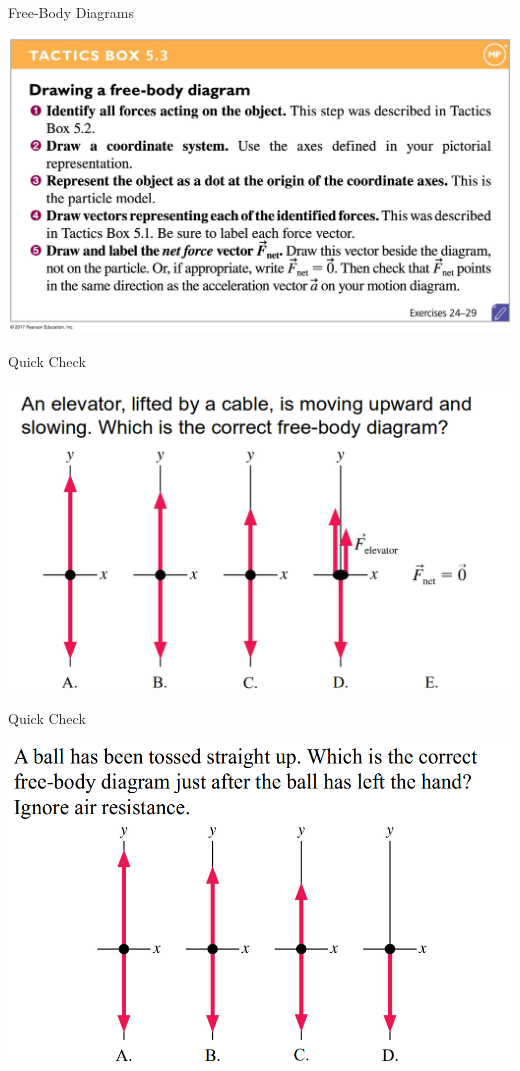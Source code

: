 \documentclass{beamer}
\newcommand{\red}[1]{{\color{red}{#1}}}
\newcommand{\checkL}[2]{\begin{textblock*}{1cm}(#1,#2){\Large \red{\Checkmark}}\end{textblock*}}
\begin{document}
\begin{frame}{Free-Body Diagrams}
\begin{center}
   \includegraphics[width=\textwidth]{../figures/05_TacticsBox_03.jpg}
\end{center}
\end{frame}

\begin{frame}{Quick Check}
\begin{center}
   \includegraphics[width=\textwidth]{../figures/QC5_11.png}
\end{center}
\only<2>{\checkL{6.0cm}{7.8cm}}
\end{frame}

\begin{frame}{Quick Check}
\begin{center}
   \includegraphics[width=\textwidth]{../figures/QC5_12.png}
\end{center}
\only<2>{\checkL{9.0cm}{8.2cm}}
\end{frame}
\end{document}
